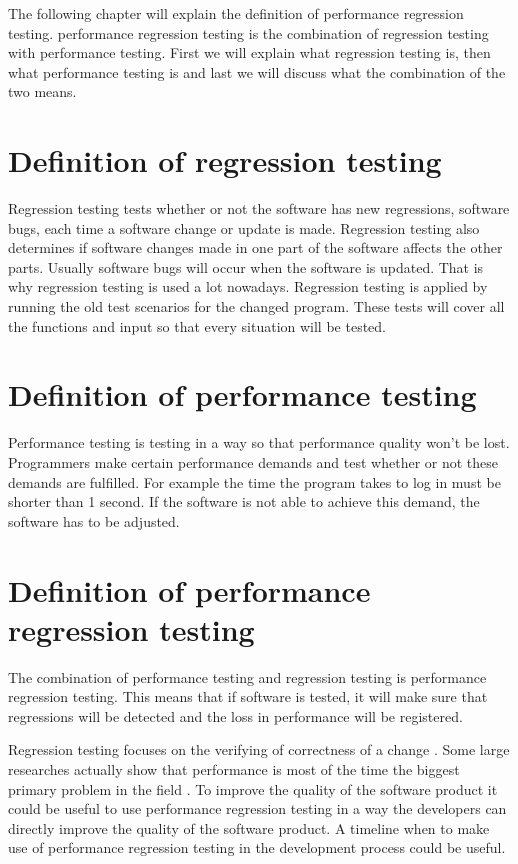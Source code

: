 The following chapter will explain the definition of performance regression testing. performance regression testing is the combination of regression testing with performance testing. First we will explain what regression testing is, then what performance testing is and last we will discuss what the combination of the two means.

\section{Definition of regression testing} 
Regression testing tests whether or not the software has new regressions, software bugs, each time a software change or update is made. Regression testing also determines if software changes made in one part of the software affects the other parts. Usually software bugs will occur when the software is updated. That is why regression testing is used a lot nowadays. Regression testing is applied by running the old test scenarios for the changed program. These tests will cover all the functions and input so that every situation will be tested.

\section{Definition of performance testing}
Performance testing is testing in a way so that performance quality won't be lost. Programmers make certain performance demands and test whether or not these demands are fulfilled. For example the time the program takes to log in must be shorter than 1 second. If the software is not able to achieve this demand, the software has to be adjusted.

\section{Definition of performance regression testing}
The combination of performance testing and regression testing is performance regression testing. This means that if software is tested, it will make sure that regressions will be detected and the loss in performance will be registered.

Regression testing focuses on the verifying of correctness of a change \cite{detection_performance_regressions}. Some large researches actually show that performance is most of the time the biggest primary problem in the field \cite{Mining_PRT_Automated}. \newline To improve the quality of the software product it could be useful to use performance regression testing in a way the developers can directly improve the quality of the software product. A timeline when to make use of performance regression testing in the development process could be useful.  